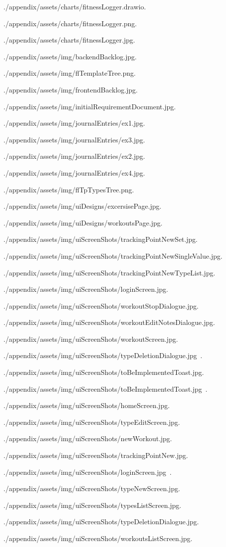 \item ./appendix/assets/charts/fitnessLogger.drawio.  
\item ./appendix/assets/charts/fitnessLogger.png.  
\item ./appendix/assets/charts/fitnessLogger.jpg.  
\item ./appendix/assets/img/backendBacklog.jpg.  
\item ./appendix/assets/img/flTemplateTree.png.  
\item ./appendix/assets/img/frontendBacklog.jpg.  
\item ./appendix/assets/img/initialRequirementDocument.jpg.  
\item ./appendix/assets/img/journalEntries/ex1.jpg.  
\item ./appendix/assets/img/journalEntries/ex3.jpg.  
\item ./appendix/assets/img/journalEntries/ex2.jpg.  
\item ./appendix/assets/img/journalEntries/ex4.jpg.  
\item ./appendix/assets/img/flTpTypesTree.png.  
\item ./appendix/assets/img/uiDesigns/excersisePage.jpg.  
\item ./appendix/assets/img/uiDesigns/workoutsPage.jpg.  
\item ./appendix/assets/img/uiScreenShots/trackingPointNewSet.jpg.  
\item ./appendix/assets/img/uiScreenShots/trackingPointNewSingleValue.jpg.  
\item ./appendix/assets/img/uiScreenShots/trackingPointNewTypeList.jpg.  
\item ./appendix/assets/img/uiScreenShots/loginScreen.jpg.  
\item ./appendix/assets/img/uiScreenShots/workoutStopDialogue.jpg.  
\item ./appendix/assets/img/uiScreenShots/workoutEditNotesDialogue.jpg.  
\item ./appendix/assets/img/uiScreenShots/workoutScreen.jpg.  
\item ./appendix/assets/img/uiScreenShots/typeDeletionDialogue.jpg~.  
\item ./appendix/assets/img/uiScreenShots/toBeImplementedToast.jpg.  
\item ./appendix/assets/img/uiScreenShots/toBeImplementedToast.jpg~.  
\item ./appendix/assets/img/uiScreenShots/homeScreen.jpg.  
\item ./appendix/assets/img/uiScreenShots/typeEditScreen.jpg.  
\item ./appendix/assets/img/uiScreenShots/newWorkout.jpg.  
\item ./appendix/assets/img/uiScreenShots/trackingPointNew.jpg.  
\item ./appendix/assets/img/uiScreenShots/loginScreen.jpg~.  
\item ./appendix/assets/img/uiScreenShots/typeNewScreen.jpg.  
\item ./appendix/assets/img/uiScreenShots/typesListScreen.jpg.  
\item ./appendix/assets/img/uiScreenShots/typeDeletionDialogue.jpg.  
\item ./appendix/assets/img/uiScreenShots/workoutsListScreen.jpg.  
